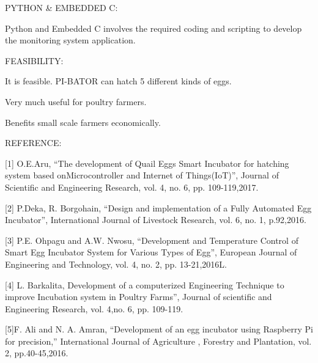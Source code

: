 \documentclass[12pt]{article}
\begin{document}
\begin{flushleft}

PYTHON \& EMBEDDED C:

Python and Embedded C involves the required coding and scripting to develop the monitoring system application.


\end{flushleft}


\begin{flushleft}

FEASIBILITY:

It is feasible.
PI-BATOR can hatch 5 different kinds of eggs.

Very much useful for poultry farmers.

Benefits small scale farmers economically.


\end{flushleft}


\begin{flushleft}

REFERENCE:

[1] O.E.Aru, “The development of Quail Eggs Smart Incubator for hatching system based onMicrocontroller and Internet of Things(IoT)”, Journal of Scientific and Engineering Research, vol. 4, no. 6, pp. 109-119,2017. 

[2] P.Deka, R. Borgohain, “Design and implementation of a Fully Automated Egg Incubator”, International Journal of Livestock Research, vol. 6, no. 1, p.92,2016.

[3] P.E. Ohpagu and A.W. Nwosu, “Development and Temperature Control of Smart Egg Incubator System for Various Types of Egg”, European Journal of Engineering and Technology, vol. 4, no. 2, pp. 13-21,2016L.

[4] L. Barkalita, Development of a computerized Engineering Technique to improve Incubation system in Poultry Farms”, Journal of scientific and Engineering Research, vol. 4,no. 6, pp. 109-119.

[5]F. Ali and N. A. Amran, “Development of an egg incubator using Raspberry Pi for precision,” International Journal of Agriculture , Forestry and Plantation, vol. 2, pp.40-45,2016.




\end{flushleft}
\end{document}
